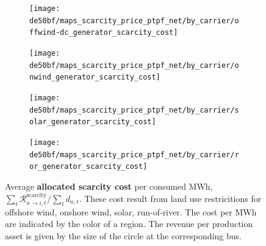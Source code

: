 \documentclass[11pt,twocolumn]{article}
\newcommand{\demand}[1][n]{d_{#1,t}}
\newcommand{\remainingcost}{\mathcal{R}}
\newcommand{\scarcitycost}{\remainingcost^\text{scarcity}}
\newcommand{\allocatescarcitycost}[1][n \rightarrow i]{\scarcitycost_{#1,t}}
\begin{document}
\begin{figure}
    \centering
    \begin{subfigure}[c]{.49\linewidth}
        \texttt{[image: de50bf/maps\_scarcity\_price\_ptpf\_net/by\_carrier/offwind-dc\_generator\_scarcity\_cost]}
        \label{fig:offwind-dc_generator_scarcity_cost}
    \end{subfigure}
    \begin{subfigure}[c]{.49\linewidth}
        \texttt{[image: de50bf/maps\_scarcity\_price\_ptpf\_net/by\_carrier/onwind\_generator\_scarcity\_cost]}
        \label{fig:onwind_generator_scarcity_cost}
    \end{subfigure}
    \begin{subfigure}[c]{.49\linewidth}
        \texttt{[image: de50bf/maps\_scarcity\_price\_ptpf\_net/by\_carrier/solar\_generator\_scarcity\_cost]}
        \label{fig:solar_generator_scarcity_cost}
    \end{subfigure}
    \begin{subfigure}[c]{.49\linewidth}
        \texttt{[image: de50bf/maps\_scarcity\_price\_ptpf\_net/by\_carrier/ror\_generator\_scarcity\_cost]}
        \label{fig:ror_generator_scarcity_cost}
    \end{subfigure}
    \caption{Average \textbf{allocated scarcity cost} per consumed MWh, $\sum_t \allocatescarcitycost / \sum_t \demand$. These cost result from land use restricitions for offshore wind, onshore wind,  solar, run-of-river. The cost per MWh are indicated by the color of a region. The revenue per production asset is given by the size of the circle at the corresponding bus.}
    \label{fig:scarcity_price}
\end{figure}





\clearpage
\printbibliography
\end{document}
